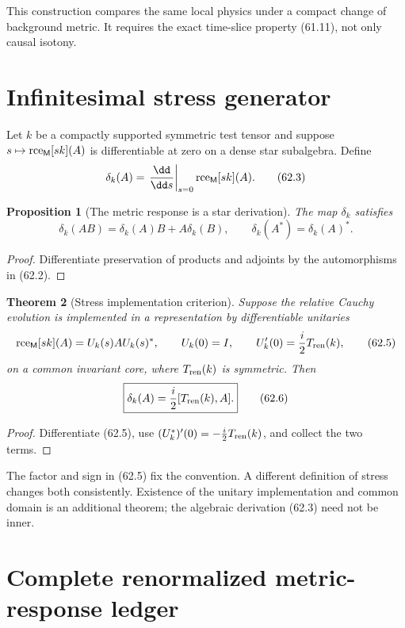 \documentclass[11pt]{article}
\newtheorem{theorem}{Theorem}[section]
\newtheorem{proposition}[theorem]{Proposition}
\theoremstyle{remark}
\begin{document}
This construction compares the same local physics under a compact
change of background metric.  It requires the exact time-slice
property (61.11), not only causal isotony.

\section{Infinitesimal stress generator}

Let \(k\) be a compactly supported symmetric test tensor and suppose
\(s\mapsto{\rm rce}_{\mathsf M}[sk](A)\) is differentiable at zero
on a dense star subalgebra.  Define
\[
 \delta_k(A)=
 \left.\frac{\dd}{\dd s}\right|_{s=0}
 {\rm rce}_{\mathsf M}[sk](A).                          \tag{62.3}
\]

\begin{proposition}[The metric response is a star derivation]
\label{prop:v15v62-derivation}
The map \(\delta_k\) satisfies
\[
 \delta_k(AB)=\delta_k(A)B+A\delta_k(B),\qquad
 \delta_k(A^*)=\delta_k(A)^*.                           \tag{62.4}
\]
\end{proposition}

\begin{proof}
Differentiate preservation of products and adjoints by the
automorphisms in (62.2).
\end{proof}

\begin{theorem}[Stress implementation criterion]
\label{thm:v15v62-stress}
Suppose the relative Cauchy evolution is implemented in a
representation by differentiable unitaries
\[
 {\rm rce}_{\mathsf M}[sk](A)
 =U_k(s)AU_k(s)^*,\qquad
 U_k(0)=I,\qquad
 U_k'(0)=\frac{i}{2}T_{\rm ren}(k),                     \tag{62.5}
\]
on a common invariant core, where \(T_{\rm ren}(k)\) is symmetric.
Then
\[
 \boxed{
 \delta_k(A)=\frac{i}{2}[T_{\rm ren}(k),A].}            \tag{62.6}
\]
\end{theorem}

\begin{proof}
Differentiate (62.5), use
\((U_k^*)'(0)=-\frac{i}{2}T_{\rm ren}(k)\), and collect the two
terms.
\end{proof}

The factor and sign in (62.5) fix the convention.  A different
definition of stress changes both consistently.  Existence of the
unitary implementation and common domain is an additional theorem;
the algebraic derivation (62.3) need not be inner.

\section{Complete renormalized metric-response ledger}
\end{document}
